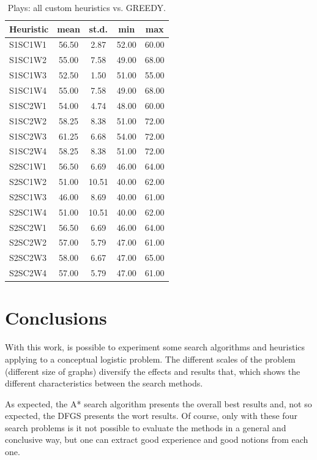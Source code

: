 \documentclass[a4paper]{article}
\begin{document}
    \begin{table}[htpb]
    \caption{ Plays: all custom heuristics vs. GREEDY.}
    \centering
    \begin{tabular}{ l | c c c c }
    Heuristic & mean & st.d. & min & max \\ \hline 
    S1SC1W1 & 56.50 & 2.87 & 52.00 & 60.00 \\
    S1SC1W2 & 55.00 & 7.58 & 49.00 & 68.00 \\
    S1SC1W3 & 52.50 & 1.50 & 51.00 & 55.00 \\
    S1SC1W4 & 55.00 & 7.58 & 49.00 & 68.00 \\
    S1SC2W1 & 54.00 & 4.74 & 48.00 & 60.00 \\
    S1SC2W2 & 58.25 & 8.38 & 51.00 & 72.00 \\
    S1SC2W3 & 61.25 & 6.68 & 54.00 & 72.00 \\
    S1SC2W4 & 58.25 & 8.38 & 51.00 & 72.00 \\
    S2SC1W1 & 56.50 & 6.69 & 46.00 & 64.00 \\
    S2SC1W2 & 51.00 & 10.51 & 40.00 & 62.00 \\
    S2SC1W3 & 46.00 & 8.69 & 40.00 & 61.00 \\
    S2SC1W4 & 51.00 & 10.51 & 40.00 & 62.00 \\
    S2SC2W1 & 56.50 & 6.69 & 46.00 & 64.00 \\
    S2SC2W2 & 57.00 & 5.79 & 47.00 & 61.00 \\
    S2SC2W3 & 58.00 & 6.67 & 47.00 & 65.00 \\
    S2SC2W4 & 57.00 & 5.79 & 47.00 & 61.00 
    \end{tabular}
    \label{tabplaysGREEDY}
    \end{table}

    

\section{Conclusions}

With this work, is possible to experiment some search algorithms and heuristics applying to a conceptual logistic problem. The different scales of the problem (different size of graphs) diversify the effects and results that, which shows the different characteristics between the search methods.

As expected,  the A* search algorithm presents the overall best results and, not so expected, the DFGS presents the wort results. Of course, only with these four search problems is it not possible to evaluate the methods in a general and conclusive way, but one can extract good experience and good notions from each one.




%
\end{document}
